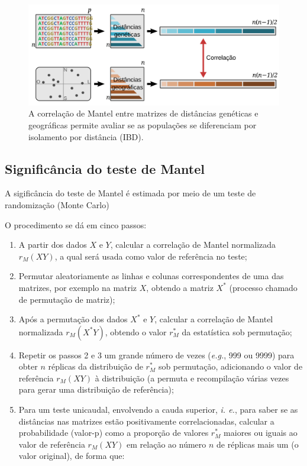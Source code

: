 \documentclass[
]{book}
\begin{document}
\begin{figure}

{\centering \includegraphics[width=800px]{figs/mantel_correlation} 

}

\caption{A correlação de Mantel entre matrizes de distâncias genéticas e geográficas permite avaliar se as populações se diferenciam por isolamento por distância (IBD).}\label{fig:mantelcorrel}
\end{figure}

\hypertarget{significuxe2ncia-do-teste-de-mantel}{%
\subsection{Significância do teste de Mantel}\label{significuxe2ncia-do-teste-de-mantel}}

A sigificância do teste de Mantel é estimada por meio de um teste de randomização (Monte Carlo)

O procedimento se dá em cinco passos:

\begin{enumerate}
\def\labelenumi{\arabic{enumi}.}
\item
  A partir dos dados \(X\) e \(Y\), calcular a correlação de Mantel normalizada \(r_M(XY)\), a qual será usada como valor de referência no teste;
\item
  Permutar aleatoriamente as linhas e colunas correspondentes de uma das matrizes, por exemplo na matriz \(X\), obtendo a matriz \(X^*\) (processo chamado de permutação de matriz);
\item
  Após a permutação dos dados \(X^*\) e \(Y\), calcular a correlação de Mantel normalizada \(r_M(X^*Y)\), obtendo o valor \(r_M^*\) da estatística sob permutação;
\item
  Repetir os passos 2 e 3 um grande número de vezes (\emph{e.g.}, 999 ou 9999) para obter \(n\) réplicas da distribuição de \(r_M^*\) sob permutação, adicionando o valor de referência \(r_M(XY)\) à distribuição (a permuta e recompilação várias vezes para gerar uma distribuição de referência);
\item
  Para um teste unicaudal, envolvendo a cauda superior, \emph{i. e.}, para saber se as distâncias nas matrizes estão positivamente correlacionadas, calcular a probabilidade (valor-p) como a proporção de valores \(r_M^*\) maiores ou iguais ao valor de referência \(r_M(XY)\) em relação ao número \(n\) de réplicas mais um (o valor original), de forma que:
\end{enumerate}
\end{document}
